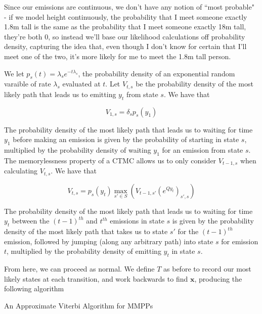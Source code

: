 Since our emissions are continuous, we don't have any notion of ``most probable" - if we model height continuously, the probability that I meet someone exactly 1.8m tall is the same as the probability that I meet someone exactly 18m tall, they're both 0, so instead we'll base our likelihood calculations off probability density, capturing the idea that, even though I don't know for certain that I'll meet one of the two, it's more likely for me to meet the 1.8m tall person.

We let $p_s(t)= \lambda_s e^{-t\lambda_s}$, the probability density of an exponential random varaible of rate $\lambda_s$ evaluated at $t$. Let $V_{t,s}$ be the probability density of the most likely path that leads us to emitting $y_t$ from state $s$. We have that

$$
V_{1,s} =  \delta_{s}p_s(y_1)
$$

The probability density of the most likely path that leads us to waiting for time $y_1$ before making an emission is given by the probability of starting in state $s$, multiplied by the probability density of waiting $y_1$ for an emission from state $s$. The memorylessness property of a CTMC allows us to only consider $V_{t-1,s}$ when calculating $V_{t,s}$. We have that

$$
V_{t,s} = p_s(y_t) \max_{s'\in S} (V_{t-1,s'}(e^{Qy_t})_{s',s})
$$

The probability density of the most likely path that leads us to waiting for time $y_t$ between the $(t-1)^{th}$ and $t^{th}$ emissions in state $s$ is given by the probability density of the most likely path that takes us to state $s'$ for the $(t-1)^{th}$ emission, followed by jumping (along any arbitrary path) into state $s$ for emission $t$, multiplied by the probability density of emitting $y_t$ in state $s$.

From here, we can proceed as normal. We define $T$ as before to record our most likely states at each transition, and work backwards to find $\mathbf{x}$, producing the following algorithm

\begin{algorithm}
\SetAlgoLined
{}

\caption{An Approximate Viterbi Algorithm for MMPPs}

\end{algorithm}

